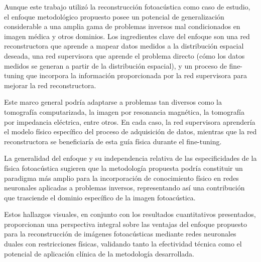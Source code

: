 Aunque este trabajo utilizó la reconstrucción fotoacústica como caso de estudio, el enfoque metodológico propuesto posee un potencial de generalización considerable a una amplia gama de problemas inversos mal condicionados en imagen médica y otros dominios. Los ingredientes clave del enfoque son una red reconstructora que aprende a mapear datos medidos a la distribución espacial deseada, una red supervisora que aprende el problema directo (cómo los datos medidos se generan a partir de la distribución espacial), y un proceso de fine-tuning que incorpora la información proporcionada por la red supervisora para mejorar la red reconstructora.

Este marco general podría adaptarse a problemas tan diversos como la tomografía computarizada, la imagen por resonancia magnética, la tomografía por impedancia eléctrica, entre otros. En cada caso, la red supervisora aprendería el modelo físico específico del proceso de adquisición de datos, mientras que la red reconstructora se beneficiaría de esta guía física durante el fine-tuning.

La generalidad del enfoque y su independencia relativa de las especificidades de la física fotoacústica sugieren que la metodología propuesta podría constituir un paradigma más amplio para la incorporación de conocimiento físico en redes neuronales aplicadas a problemas inversos, representando así una contribución que trasciende el dominio específico de la imagen fotoacústica.

Estos hallazgos visuales, en conjunto con los resultados cuantitativos presentados, proporcionan una perspectiva integral sobre las ventajas del enfoque propuesto para la reconstrucción de imágenes fotoacústicas mediante redes neuronales duales con restricciones físicas, validando tanto la efectividad técnica como el potencial de aplicación clínica de la metodología desarrollada.